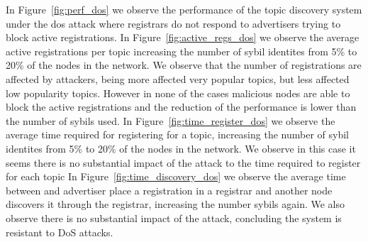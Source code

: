 In Figure~\ref{fig:perf_dos} we observe the performance of the topic discovery system under the dos attack where registrars do not respond to advertisers trying to block active registrations.
In Figure~\ref{fig:active_regs_dos} we observe the average active registrations per topic increasing the number of sybil identites from 5\% to 20\% of the nodes in the network.
We observe that the number of registrations are affected by attackers, being more affected very popular topics,  but less affected low popularity topics.  However in none of the cases malicious nodes are able to block the active registrations and the reduction of the performance is lower than the number of sybils used.
In Figure~\ref{fig:time_register_dos} we observe the average time required for registering for a topic,  increasing the number of sybil identites from 5\% to 20\% of the nodes in the network.
We observe in this case it seems there is no substantial impact of the attack to the time required to register for each topic
In Figure~\ref{fig:time_discovery_dos} we observe the average time between and advertiser place a registration in a registrar and another node discovers it through the registrar,  increasing the number sybils again.
We also observe there is no substantial impact of the attack, concluding the system is resistant to DoS attacks.

